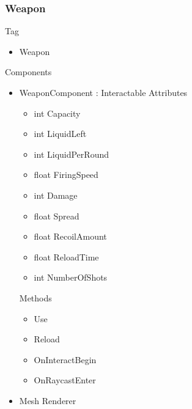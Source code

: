 \documentclass[11pt]{article}
\begin{document}
\subsubsection{Weapon}
Tag
\begin{itemize}
	\item Weapon
\end{itemize}
Components
\begin{itemize}
	\item WeaponComponent : Interactable
	\newline Attributes
	\begin{itemize}
		\item int Capacity
		\item int LiquidLeft
		\item int LiquidPerRound
		\item float FiringSpeed
		\item int Damage
		\item float Spread
		\item float RecoilAmount
		\item float ReloadTime
		\item int NumberOfShots
	\end{itemize}
	Methods
	\begin{itemize}
		\item Use
		\item Reload
		\item OnInteractBegin
		\item OnRaycastEnter
	\end{itemize}
	\item Mesh Renderer
\end{itemize}
\end{document}
